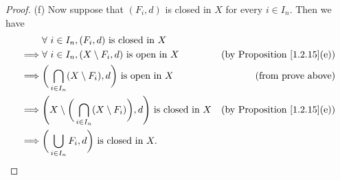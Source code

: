\begin{proof}{(f)}
    Now suppose that \((F_i, d)\) is closed in \(X\) for every \(i \in I_n\).
    Then we have
    \begin{align*}
                 & \forall\ i \in I_n, (F_i, d) \text{ is closed in } X                                                                                           \\
        \implies & \forall\ i \in I_n, (X \setminus F_i, d) \text{ is open in } X                                       & \text{(by Proposition \ref{1.2.15}(e))} \\
        \implies & \bigg(\bigcap_{i \in I_n} (X \setminus F_i), d\bigg) \text{ is open in } X                           & \text{(from prove above)}               \\
        \implies & \Bigg(X \setminus \bigg(\bigcap_{i \in I_n} (X \setminus F_i)\bigg), d\Bigg) \text{ is closed in } X & \text{(by Proposition \ref{1.2.15}(e))} \\
        \implies & \bigg(\bigcup_{i \in I_n} F_i, d\bigg) \text{ is closed in } X.
    \end{align*}
\end{proof}

